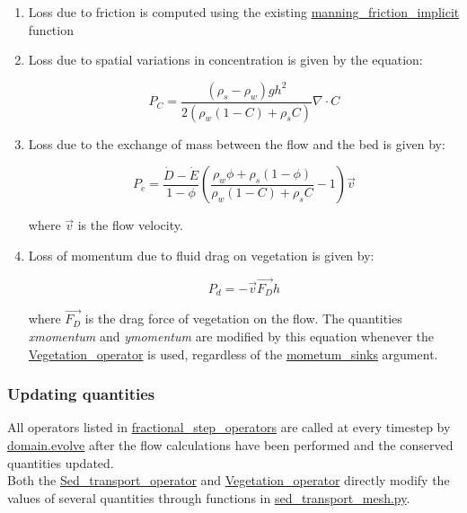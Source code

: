 \documentclass[10pt]{article}
\begin{document}
\begin{enumerate}
\item Loss due to friction is computed using the existing \url{manning_friction_implicit} function

\item Loss due to spatial variations in concentration is given by the equation:

\begin{equation}
P_C = \frac{(\rho_s - \rho_w) g h^2}{2 (\rho_w (1 - C) + \rho_s C)} \nabla \cdot C
\end{equation} 

\item Loss due to the exchange of mass between the flow and the bed is given by:

\begin{equation}
P_e = \frac{\dot{D} - \dot{E}}{1 - \phi} \left(\frac{\rho_w \phi + \rho_s (1 - \phi)}{\rho_w (1 - C) + \rho_s C} -1 \right) \vec{v}
\end{equation}

\noindent where $\vec{v}$ is the flow velocity.

\item Loss of momentum due to fluid drag on vegetation is given by:

\begin{equation}
P_d = - \vec{v} \vec{F_D} h
\end{equation}

\noindent where $\vec{F_D}$ is the drag force of vegetation on the flow. The quantities \textit{xmomentum} and \textit{ymomentum} are modified by this equation whenever the \url{Vegetation_operator} is used, regardless of the \url{mometum_sinks} argument.

\end{enumerate}

\subsubsection{Updating quantities}

All operators listed in \url{fractional_step_operators} are called at every timestep by \url{domain.evolve} after the flow calculations have been performed and the conserved quantities updated.
\ \\


Both the \url{Sed_transport_operator} and \url{Vegetation_operator} directly modify the values of several quantities through functions in \url{sed_transport_mesh.py}.
\end{document}

